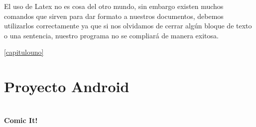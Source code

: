 \documentclass[12pt]{report}
\begin{document}
El uso de Latex no es cosa del otro mundo, sin embargo existen muchos comandos que sirven para dar formato a nuestros documentos, debemos utilizarlos correctamente ya que si nos olvidamos de cerrar algún bloque de texto o una sentencia, nuestro programa no se compliará de manera exitosa.
\newline
\newline
\newline
\newline
\newline
\newline
\newline
\newline
\newline
\newline
\newline
\newline
\newline
\newline
\newline
\newline
\newline
\newline
\newline
\newline
\newline
\newline
\newline
\newline
\newline
\newline
\newline
\newline

 \ref{capitulouno}




\chapter{Proyecto Android \label{capitulodos}}
\begin{center}
		\Huge{\textbf{\\Comic It!	\vspace{1em}}}
\end{center}	
\end{document}
